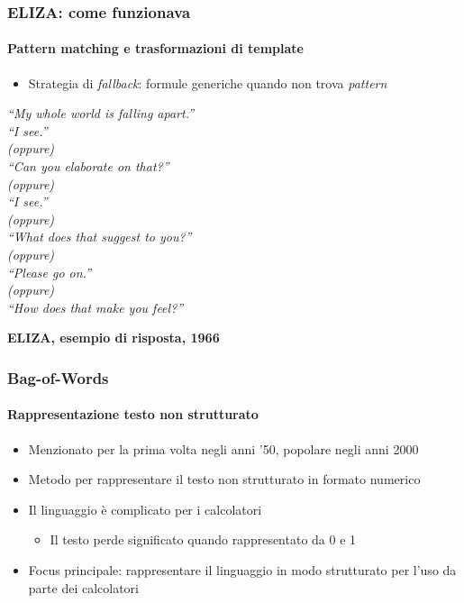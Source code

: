 \begin{frame}[t,fragile] \frametitle{ELIZA: come funzionava}
	\framesubtitle{Pattern matching e trasformazioni di template}
	{\small
		\begin{itemize}[leftmargin=10pt,align=right]
			\item[\alert{\faArrowCircleRight}] \alert{Strategia di \textit{fallback}:} formule generiche quando non trova \textit{pattern}
		\end{itemize}
		\vspace*{.3cm}
		\hspace*{4cm}
		\begin{minipage}[t]{.6\textwidth}
			\renewcommand{\epigraphsize}{\scriptsize}
			\setlength{\afterepigraphskip}{0pt}
			\setlength{\beforeepigraphskip}{5pt}
			\setlength{\epigraphwidth}{0.9\textwidth}
			\epigraph{\textit{\alert{\faUser} ``\alert{My} whole world is falling apart.''\\
			\alert{\faTerminal} ``I see.''\\
			(oppure)\\
			\alert{\faTerminal} ``Can you elaborate on that?''\\
			(oppure)\\
			\alert{\faTerminal} ``I see.''\\
			(oppure)\\
			\alert{\faTerminal} ``What does that suggest to you?''\\
			(oppure)\\
			\alert{\faTerminal} ``Please go on.''\\
			(oppure)\\
			\alert{\faTerminal} ``How does that make you feel?''
			}}{\textbf{ELIZA, esempio di risposta, 1966}}
		\end{minipage}
	}
\end{frame}
%
\begin{frame}[t,fragile] \frametitle{Bag-of-Words}
    \framesubtitle{Rappresentazione testo non strutturato}
	{\small
		\begin{minipage}[t]{\textwidth}
	    	\begin{itemize}[leftmargin=10pt,align=right]
				\onslide<1->\item[\alert{\faArrowCircleRight}] Menzionato per la prima volta negli anni '50, popolare negli anni 2000
				\onslide<2->\item[\alert{\faArrowCircleRight}] Metodo per rappresentare il testo \alert{non strutturato} in formato numerico
				\onslide<3->\item[\alert{\faArrowCircleRight}] Il \alert{linguaggio è complicato} per i calcolatori
				\begin{itemize}[leftmargin=10pt,align=right]
					\item[\alert{\faArrowCircleRight}] Il testo perde significato quando rappresentato da 0 e 1
				\end{itemize}
				\item[\alert{\faArrowCircleRight}] \alert{Focus principale:} rappresentare il linguaggio in \alert{modo strutturato} per l'uso da parte dei calcolatori
			\end{itemize}
        \end{minipage}
	}
\end{frame}
